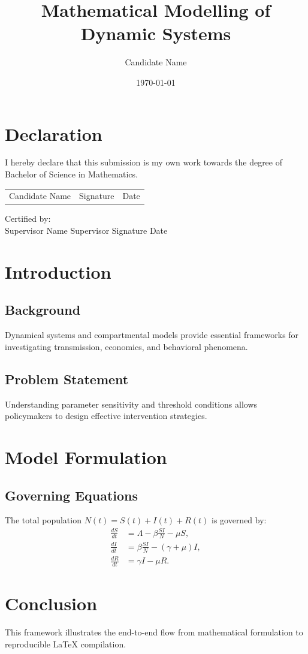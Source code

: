 \documentclass[12pt,a4paper,oneside]{report}
\title{Mathematical Modelling of Dynamic Systems}
\author{Candidate Name}
\date{\today}
\begin{document}
\maketitle

\chapter*{Declaration}
I hereby declare that this submission is my own work towards the degree of Bachelor of Science in Mathematics.

\vspace{1cm}
\begin{tabular}{p{}p{}p{}}
Candidate Name & Signature & Date \\
\end{tabular}

\vspace{1cm}
Certified by:\\[0.3cm]
Supervisor Name \hfill Supervisor Signature \hfill Date

\chapter{Introduction}
\section{Background}
Dynamical systems and compartmental models provide essential frameworks for investigating transmission, economics, and behavioral phenomena.

\section{Problem Statement}
Understanding parameter sensitivity and threshold conditions allows policymakers to design effective intervention strategies.

\chapter{Model Formulation}
\section{Governing Equations}
The total population $N(t) = S(t) + I(t) + R(t)$ is governed by:
\begin{align}
\frac{dS}{dt} &= \Lambda - \beta \frac{S I}{N} - \mu S, \tag{2.1} \\
\frac{dI}{dt} &= \beta \frac{S I}{N} - (\gamma + \mu) I, \tag{2.2} \\
\frac{dR}{dt} &= \gamma I - \mu R. \tag{2.3}
\end{align}

\chapter{Conclusion}
This framework illustrates the end-to-end flow from mathematical formulation to reproducible LaTeX compilation.
\end{document}
